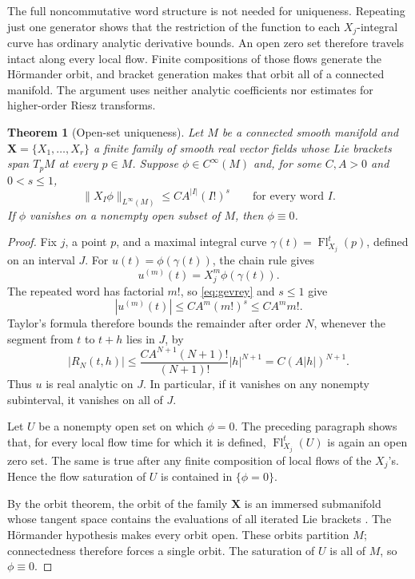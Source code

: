 \documentclass[11pt]{article}
\newtheorem{theorem}{Theorem}
\newcommand{\X}{\mathbf X}
\begin{document}
The full noncommutative word structure is not needed for uniqueness.  Repeating
just one generator shows that the restriction of the function to each
\(X_j\)-integral curve has ordinary analytic derivative bounds.  An open zero
set therefore travels intact along every local flow.  Finite compositions of
those flows generate the H\"ormander orbit, and bracket generation makes that
orbit all of a connected manifold.  The argument uses neither analytic
coefficients nor estimates for higher-order Riesz transforms.

\begin{theorem}[Open-set uniqueness]\label{thm:unique}
Let \(M\) be a connected smooth manifold and
\(\X=\{X_1,\ldots,X_r\}\) a finite family of smooth real vector fields whose
Lie brackets span \(T_pM\) at every \(p\in M\).  Suppose
\(\phi\in C^\infty(M)\) and, for some \(C,A>0\) and \(0<s\le1\),
\begin{equation}\label{eq:gevrey}
 \|X_I\phi\|_{L^\infty(M)}
 \le C A^{|I|}(I!)^s
 \qquad\text{for every word }I.
\end{equation}
If \(\phi\) vanishes on a nonempty open subset of \(M\), then
\(\phi\equiv0\).
\end{theorem}

\begin{proof}
Fix \(j\), a point \(p\), and a maximal integral curve
\(\gamma(t)=\operatorname{Fl}_{X_j}^{t}(p)\), defined on an interval \(J\).
For \(u(t)=\phi(\gamma(t))\), the chain rule gives
\[
 u^{(m)}(t)=X_j^m\phi(\gamma(t)).
\]
The repeated word has factorial \(m!\), so \eqref{eq:gevrey} and \(s\le1\)
give
\[
 |u^{(m)}(t)|\le CA^m(m!)^s\le CA^m m!.
\]
Taylor's formula therefore bounds the remainder after order \(N\), whenever
the segment from \(t\) to \(t+h\) lies in \(J\), by
\[
 |R_N(t,h)|
 \le \frac{CA^{N+1}(N+1)!}{(N+1)!}|h|^{N+1}
 =C(A|h|)^{N+1}.
\]
Thus \(u\) is real analytic on \(J\).  In particular, if it vanishes on any
nonempty subinterval, it vanishes on all of \(J\).

Let \(U\) be a nonempty open set on which \(\phi=0\).  The preceding paragraph
shows that, for every local flow time for which it is defined,
\(\operatorname{Fl}_{X_j}^{t}(U)\) is again an open zero set.  The same is true
after any finite composition of local flows of the \(X_j\)'s.  Hence the flow
saturation of \(U\) is contained in \(\{\phi=0\}\).

By the orbit theorem, the orbit of the family \(\X\) is an immersed submanifold
whose tangent space contains the evaluations of all iterated Lie brackets
\cite{sussmann}.  The H\"ormander hypothesis makes every orbit open.  These
orbits partition \(M\); connectedness therefore forces a single orbit.  The
saturation of \(U\) is all of \(M\), so \(\phi\equiv0\).
\end{proof}
\end{document}
